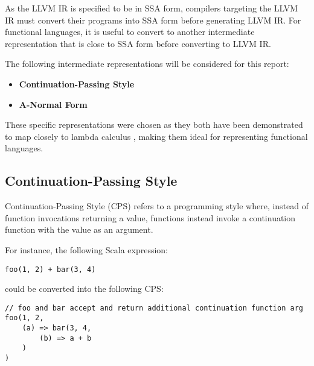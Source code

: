 As the LLVM IR is specified to be in SSA form, compilers targeting the LLVM IR must convert their
programs into SSA form before generating LLVM IR. For functional languages, it is useful to convert
to another intermediate representation that is close to SSA form before converting to LLVM IR.

The following intermediate representations will be considered for this report:
\begin{itemize}
    \onehalfspacing
    \item \textbf{Continuation-Passing Style}
    \item \textbf{A-Normal Form}
\end{itemize}

These specific representations were chosen as they both have been demonstrated to map closely to
lambda calculus \autocite{morrisett1999systemf,flanagan1993essence}, making them ideal for
representing functional languages.

\subsection{Continuation-Passing Style}
\label{sec:cps}

Continuation-Passing Style (CPS) refers to a programming style where, instead of function
invocations returning a value, functions instead invoke a continuation function with the value as
an argument.


For instance, the following Scala expression:

\begin{verbatim}
foo(1, 2) + bar(3, 4)
\end{verbatim}

could be converted into the following CPS:

\begin{verbatim}
// foo and bar accept and return additional continuation function arg
foo(1, 2,
    (a) => bar(3, 4,
        (b) => a + b
    )
)
\end{verbatim}

